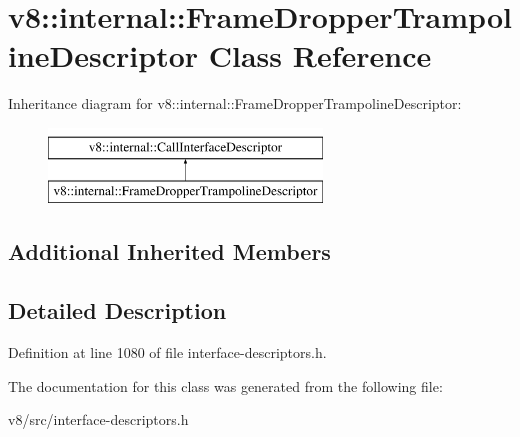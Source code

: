 \hypertarget{classv8_1_1internal_1_1FrameDropperTrampolineDescriptor}{}\section{v8\+:\+:internal\+:\+:Frame\+Dropper\+Trampoline\+Descriptor Class Reference}
\label{classv8_1_1internal_1_1FrameDropperTrampolineDescriptor}
Inheritance diagram for v8\+:\+:internal\+:\+:Frame\+Dropper\+Trampoline\+Descriptor\+:\begin{figure}[H]
\begin{center}
\leavevmode
\includegraphics[height=2.000000cm]{classv8_1_1internal_1_1FrameDropperTrampolineDescriptor}
\end{center}
\end{figure}
\subsection*{Additional Inherited Members}


\subsection{Detailed Description}


Definition at line 1080 of file interface-\/descriptors.\+h.



The documentation for this class was generated from the following file\+:\begin{DoxyCompactItemize}
\item 
v8/src/interface-\/descriptors.\+h\end{DoxyCompactItemize}
